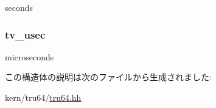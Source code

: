 seconds \hypertarget{structTru64_1_1timeval_a992cb17cdfd7acb0c5088ffea2054731}{
\subsubsection[{tv\_\-usec}]{ {\bf tv\_\-usec}}}
\label{structTru64_1_1timeval_a992cb17cdfd7acb0c5088ffea2054731}


microseconds 

この構造体の説明は次のファイルから生成されました:\begin{DoxyCompactItemize}
\item 
kern/tru64/\hyperlink{kern_2tru64_2tru64_8hh}{tru64.hh}\end{DoxyCompactItemize}

